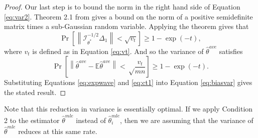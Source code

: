 \documentclass[twoside]{article}
\DeclareMathOperator*{\tr}{tr}
\newcommand{\zero}{\text{\textbf{0}}}
\newcommand{\E}{\mathbb{E}}
\newcommand{\w}{\theta}
\newcommand{\wave}{\hat\w^{ave}}
\newcommand{\wtave}{\E\hat\w^{ave}}
\newcommand{\wmle}{\hat\w^{mle}}
\newcommand{\wstar}{{\w^{*}}}
\newcommand{\I}{\mathcal I}
\newcommand{\normal}[2]{\ensuremath{\mathcal{N}\left({{#1}},{{#2}}\right)}}
\newcommand{\ltwo}[1]{{\lVert {#1} \rVert}}
\newcommand{\ltwobig}[1]{{\left\lVert {#1} \right\rVert}}
\newcommand{\prob}[1]{\Pr\left[{#1}\right]}
\begin{document}
\begin{proof}
Our last step is to bound the norm in the right hand side of Equation \ref{eq:var2}.
Theorem 2.1 from \cite{hsu2012tail} gives a bound on the norm of a positive semidefinite matrix times a sub-Gaussian random variable.
Applying the theorem gives that %
\begin{equation}
\prob{
    \ltwobig{\I^{-1/2}_\wstar\Delta_1} < \sqrt{v_t}
}
\ge 1-\exp(-t)
,
\end{equation}
where $v_t$ is defined as in Equation \ref{eq:vt}.
And so the variance of $\wave$ satisfies
\begin{equation}
\prob{
\ltwobig{\wave-\E\wave}
<
\sqrt\frac{v_t}{{mn}}
}
\ge 1-\exp(-t)
.
\label{eq:ct1}
\end{equation}
Substituting Equations \ref{eq:expwave} and \ref{eq:ct1} into Equation \ref{eq:biasvar} gives the stated result.
\end{proof}

Note that this reduction in variance is essentially optimal.
If we apply Condition 2 to the estimator $\wmle$ instead of $\wmle_i$,
then we are assuming that the variance of $\wmle$ reduces at this same rate.
\end{document}
